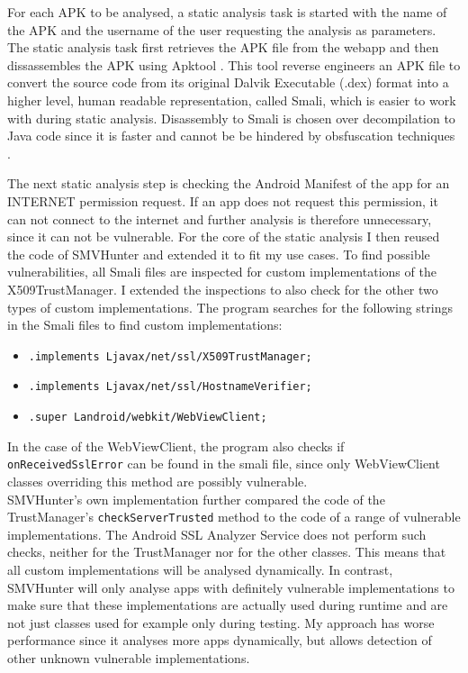 \documentclass[draft,final]{vutinfth} %
\begin{document}
For each APK to be analysed, a static analysis task is started with the name of the APK and the username of the user requesting the analysis as parameters. The static analysis task first retrieves the APK file from the webapp and then dissassembles the APK using Apktool \cite{Apktool}. This tool reverse engineers an APK file to convert the source code from its original Dalvik Executable (.dex) format into a higher level, human readable representation, called Smali, which is easier to work with during static analysis. Disassembly to Smali is chosen over decompilation to Java code since it is faster and cannot be be hindered by obsfuscation techniques \cite{Sounthiraraj}.

The next static analysis step is checking the Android Manifest of the app for an INTERNET permission request. If an app does not request this permission, it can not connect to the internet and further analysis is therefore unnecessary, since it can not be vulnerable. For the core of the static analysis I then reused the code of SMVHunter and extended it to fit my use cases. To find possible vulnerabilities, all Smali files are inspected for custom implementations of the X509TrustManager. I extended the inspections to also check for the other two types of custom implementations. The program searches for the following strings in the Smali files to find custom implementations:
\begin{itemize}
\item \texttt{.implements Ljavax/net/ssl/X509TrustManager;}
\item \texttt{.implements Ljavax/net/ssl/HostnameVerifier;}
\item \texttt{.super Landroid/webkit/WebViewClient;}
\end{itemize}
In the case of the WebViewClient, the program also checks if \texttt{onReceivedSslError} can be found in the smali file, since only WebViewClient classes overriding this method are possibly vulnerable.\\
SMVHunter's own implementation further compared the code of the TrustManager's \texttt{checkServerTrusted} method to the code of a range of vulnerable implementations. The Android SSL Analyzer Service does not perform such checks, neither for the TrustManager nor for the other classes. This means that all custom implementations will be analysed dynamically. In contrast, SMVHunter will only analyse apps with definitely vulnerable implementations to make sure that these implementations are actually used during runtime and are not just classes used for example only during testing. My approach has worse performance since it analyses more apps dynamically, but allows detection of other unknown vulnerable implementations.\\
\end{document}
